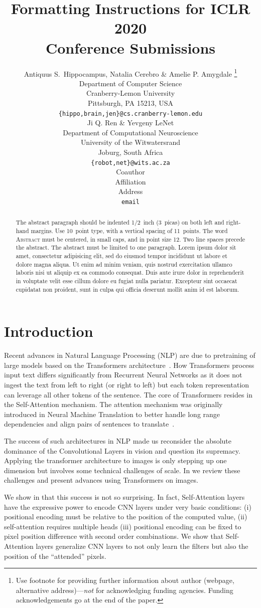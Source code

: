\documentclass{article} %
\title{Formatting Instructions for ICLR 2020 \\ Conference Submissions}
\author{Antiquus S.~Hippocampus, Natalia Cerebro \& Amelie P. Amygdale \thanks{ Use footnote for providing further information
about author (webpage, alternative address)---\emph{not} for acknowledging
funding agencies.  Funding acknowledgements go at the end of the paper.} \\
Department of Computer Science\\
Cranberry-Lemon University\\
Pittsburgh, PA 15213, USA \\
\texttt{\{hippo,brain,jen\}@cs.cranberry-lemon.edu} \\
\And
Ji Q. Ren \& Yevgeny LeNet \\
Department of Computational Neuroscience \\
University of the Witwatersrand \\
Joburg, South Africa \\
\texttt{\{robot,net\}@wits.ac.za} \\
\AND
Coauthor \\
Affiliation \\
Address \\
\texttt{email}
}
\begin{document}
\maketitle

\begin{abstract}
The abstract paragraph should be indented 1/2~inch (3~picas) on both left and
right-hand margins. Use 10~point type, with a vertical spacing of 11~points.
The word \textsc{Abstract} must be centered, in small caps, and in point size 12. Two
line spaces precede the abstract. The abstract must be limited to one
paragraph.
Lorem ipsum dolor sit amet, consectetur adipisicing elit, sed do eiusmod
tempor incididunt ut labore et dolore magna aliqua. Ut enim ad minim veniam,
quis nostrud exercitation ullamco laboris nisi ut aliquip ex ea commodo
consequat. Duis aute irure dolor in reprehenderit in voluptate velit esse
cillum dolore eu fugiat nulla pariatur. Excepteur sint occaecat cupidatat non
proident, sunt in culpa qui officia deserunt mollit anim id est laborum.
\end{abstract}

\section{Introduction}

Recent advances in Natural Language Processing (NLP) are due to pretraining of large models based on the Transformers architecture~\citep{vaswani17attentionisallyouneed}. 
%
%
How Transformers process input text differs significantly from Recurrent Neural Networks as it does not ingest the text from left to right (or right to left) but each token representation can leverage all other tokens of the sentence.
% 
The core of Transformers resides in the Self-Attention mechanism.
%
The attention mechanism was originally introduced in Neural Machine Translation to better handle long range dependencies and align pairs of sentences to translate~\citep{Bahdanau2015attention}.

The success of such architectures in NLP made us reconsider the absolute dominance of the Convolutional Layers in vision and question its supremacy.
%
Applying the transformer architecture to images is only stepping up one dimension but involves some technical challenges of scale.
%
In  we review these challenges and present advances using Transformers on images.

We show in  that this success is not so surprising. 
%
In fact, Self-Attention layers have the expressive power to encode CNN layers under very basic conditions: (i) positional encoding must be relative to the position of the computed value, (ii) self-attention requires multiple heads (iii) positional encoding can be fixed to pixel position difference with second order combinations. %
%
We show that Self-Attention layers generalize CNN layers to not only learn the filters but also the position of the ``attended'' pixels.
\end{document}
